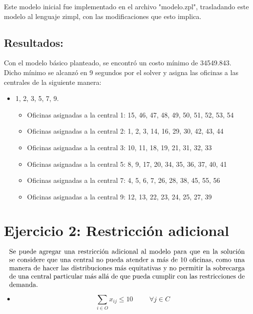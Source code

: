 \documentclass{article}
\begin{document}
Este modelo inicial fue implementado en el archivo "modelo.zpl", trasladando este modelo al lenguaje zimpl, con las modificaciones que esto implica.

\subsection*{Resultados:}

Con el modelo básico planteado, se encontró un costo mínimo de 34549.843. Dicho mínimo se alcanzó en 9 segundos por el solver y asigna las oficinas a las centrales de la siguiente manera:
\vspace{0.5cm}

\begin{itemize}
    \item{} 1, 2, 3, 5, 7, 9.
	\begin{itemize}
	\item Oficinas asignadas a la central 1: 15, 46, 47, 48, 49, 50, 51, 52, 53, 54
	\item Oficinas asignadas a la central 2: 1, 2, 3, 14, 16, 29, 30, 42, 43, 44
	\item Oficinas asignadas a la central 3: 10, 11, 18, 19, 21, 31, 32, 33
	\item Oficinas asignadas a la central 5: 8, 9, 17, 20, 34, 35, 36, 37, 40, 41
	\item Oficinas asignadas a la central 7: 4, 5, 6, 7, 26, 28, 38, 45, 55, 56
	\item Oficinas asignadas a la central 9: 12, 13, 22, 23, 24, 25, 27, 39
	\end{itemize}
\end{itemize}



\section*{Ejercicio 2: Restricción adicional}
\[
\parbox{\textwidth}{Se puede agregar una restricción adicional al modelo para que en la solución se considere que una central no pueda atender a más de 10 oficinas, como una manera de hacer las distribuciones más equitativas y no permitir la sobrecarga de una central particular más allá de que pueda cumplir con las restricciones de demanda.}
\]


\begin{itemize}
    \item {}
    \[
   \sum_{i \in O} x_{ij} \leq 10 \hspace{1cm}\forall j \in C
    \]
\end{itemize}
\end{document}
